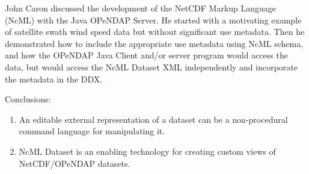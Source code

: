 John Caron discussed the development of the NetCDF Markup Language
(NcML) with the Java OPeNDAP Server.  He started with a motivating
example of satellite swath wind speed data but without significant
use metadata.  Then he demonstrated how to include the appropriate
use metadata using NcML schema, and how the OPeNDAP Java Client
and/or server program would access the data, but would access
the NcML Dataset XML independently and incorporate the metadata
in the DDX.  

Conclusions:
\begin{enumerate}
   \item  An editable external representation of a dataset can be a
          non-procedural command language for manipulating it.
   \item  NcML Dataset is an enabling technology for creating
          custom views of NetCDF/OPeNDAP datasets.
\end{enumerate}
%
%
%
%

